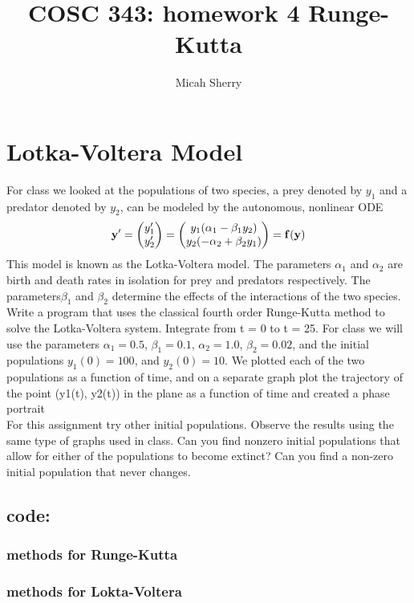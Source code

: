 \documentclass{article}
\title{COSC 343: homework 4 Runge-Kutta}
\author{Micah Sherry}
\begin{document}
\maketitle
\section{Lotka-Voltera Model}
For class we looked at the populations of two species, a prey denoted by $y_1$ and a
predator denoted by $y_2$, can be modeled by the autonomous, nonlinear ODE
$$
\bf{y}' =
\begin{pmatrix}
	y_1' \\ y_2'
\end{pmatrix} = 
\begin{pmatrix}
	y_1(\alpha_1-\beta_1y_2) \\ y_2(-\alpha_2+\beta_2y_1)
\end{pmatrix}
= \bf{f(y)}
$$
This model is known as the Lotka-Voltera model. The parameters $\alpha_1$ and $\alpha_2$ are birth
and death rates in isolation for prey and predators respectively. The parameters$\beta_1$ and $\beta_2$ determine the effects of the interactions of the two species. Write a program that
uses the classical fourth order Runge-Kutta method to solve the Lotka-Voltera system.
Integrate from t = 0 to t = 25. For class we will use the parameters $\alpha_1 = 0.5$, $\beta_1 =
0.1$, $\alpha_2 = 1.0$, $\beta_2 = 0.02$, and the initial populations $y_1(0) = 100$, and $y_2(0) = 10$. We
plotted each of the two populations as a function of time, and on a separate graph plot
the trajectory of the point (y1(t), y2(t)) in the plane as a function of time and created
a phase portrait\\
For this assignment try other initial populations. Observe the results using the same
type of graphs used in class. Can you find nonzero initial populations that allow for
either of the populations to become extinct? Can you find a non-zero initial population
that never changes.
\subsection{code:}
\subsubsection*{methods for Runge-Kutta}

\subsubsection*{methods for Lokta-Voltera}

\end{document}
